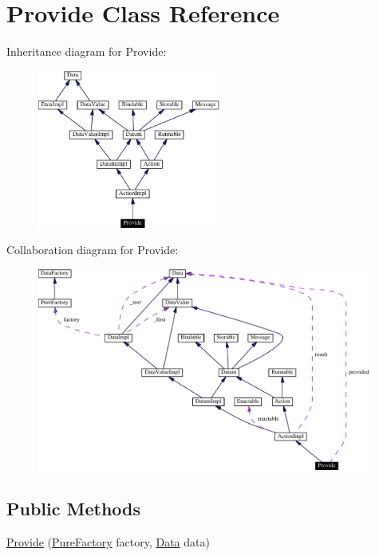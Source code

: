 \hypertarget{classProvide}{
\section{Provide  Class Reference}
\label{classProvide}
}
Inheritance diagram for Provide:\begin{figure}[H]
\begin{center}
\leavevmode
\includegraphics[width=170pt]{classProvide__inherit__graph}
\end{center}
\end{figure}
Collaboration diagram for Provide:\begin{figure}[H]
\begin{center}
\leavevmode
\includegraphics[width=314pt]{classProvide__coll__graph}
\end{center}
\end{figure}
\subsection*{Public Methods}
\begin{CompactItemize}
\item 
\hyperlink{classProvide_a0}{Provide} (\hyperlink{classPureFactory}{Pure\-Factory} factory, \hyperlink{interfaceData}{Data} data)
\end{CompactItemize}


